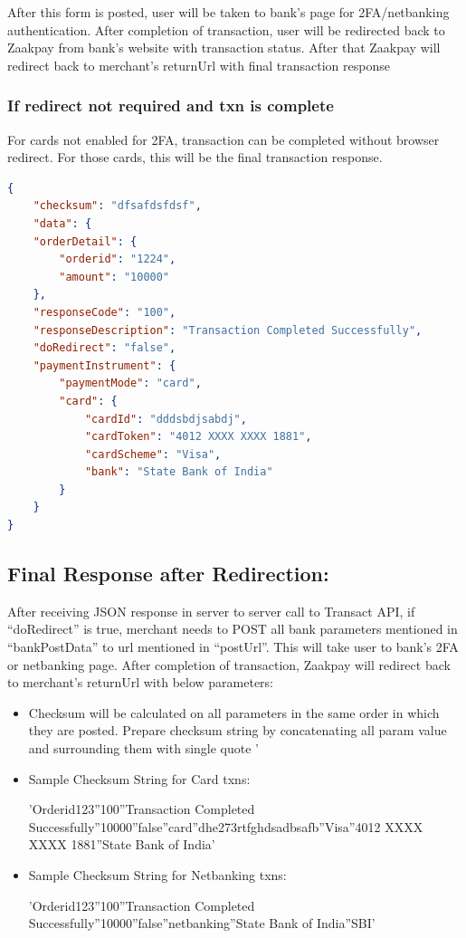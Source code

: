 \documentclass{article}
\begin{document}
After this form is posted, user will be taken to bank’s page for 2FA/netbanking authentication. After completion of transaction, user will be redirected back to Zaakpay from bank’s website with transaction status.  After that Zaakpay will redirect back to merchant’s returnUrl with final transaction response 
\newpage
\subsubsection{If redirect not required and txn is complete}
 For cards not enabled for 2FA, transaction can be  completed without browser redirect. For those cards, this will be the final transaction response. 
 
 \begin{lstlisting}[language=json,breaklines=true]
 { 
    "checksum": "dfsafdsfdsf", 
    "data": { 
    "orderDetail": { 
        "orderid": "1224", 
        "amount": "10000" 
    }, 
    "responseCode": "100", 
    "responseDescription": "Transaction Completed Successfully", 
    "doRedirect": "false", 
    "paymentInstrument": { 
        "paymentMode": "card", 
        "card": { 
            "cardId": "dddsbdjsabdj", 
            "cardToken": "4012 XXXX XXXX 1881", 
            "cardScheme": "Visa", 
            "bank": "State Bank of India" 
        } 
    } 
}
 \end{lstlisting}
 \subsection{Final Response after Redirection:}
 After receiving JSON response in server to server call to Transact API,  if “doRedirect” is true, merchant needs to POST all bank parameters mentioned in “bankPostData” to url mentioned in “postUrl”. This will take user to  bank’s 2FA or netbanking page. After completion of transaction, Zaakpay will redirect back to merchant’s  returnUrl with below parameters: 
 \begin{itemize}
\item Checksum will be calculated on all parameters in the same order in which they are posted. Prepare 
checksum string by concatenating all param value and surrounding them with single quote '  
\item Sample Checksum String for Card txns: 
 
'Orderid123''100''Transaction   Completed   Successfully''10000''false''card''dhe273rtfghdsadbsafb''Visa''4012  
XXXX XXXX 1881''State Bank of India' 
 
\item Sample Checksum String for Netbanking txns: 
 
'Orderid123''100''Transaction Completed Successfully''10000''false''netbanking''State Bank of India''SBI' 
\end{itemize}
\end{document}
